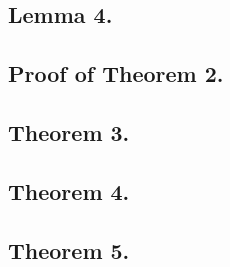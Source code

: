 \documentclass[main]{subfiles}
\begin{document}
\subsection{Lemma 4.}

\subsection{Proof of Theorem 2.}

\subsection{Theorem 3.}

\subsection{Theorem 4.}

\subsection{Theorem 5.}
\end{document}
